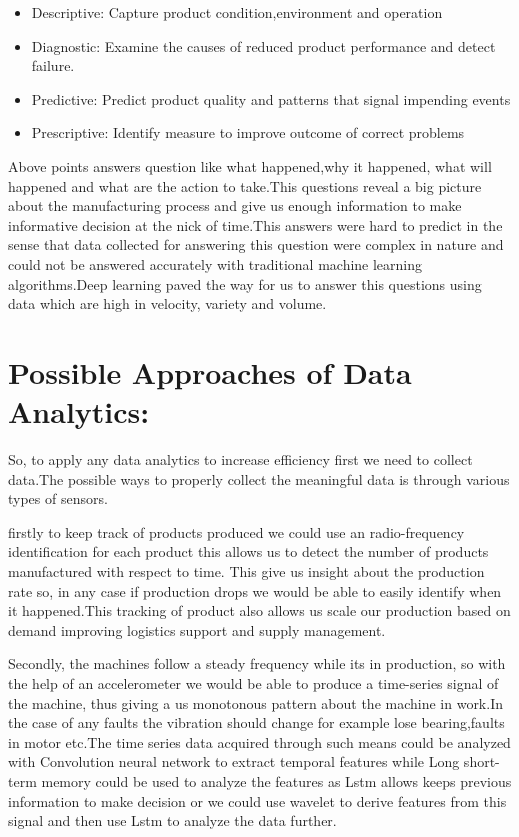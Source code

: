 \documentclass{article}
\begin{document}
\begin{normalsize}
\begin{itemize}
\item{Descriptive: Capture product condition,environment and operation}
\item{Diagnostic: Examine the causes of reduced product performance and detect failure. 
} 
\item{Predictive: Predict product quality and patterns that signal impending events}
\item{Prescriptive: Identify measure to improve outcome of correct problems}
	\end{itemize}
		Above points answers question like what happened,why it happened, what will happened and what are the action to take.This questions reveal a big picture about the manufacturing process and give us enough information to make informative decision at the nick of time.This answers were hard to predict in the sense that data collected for answering this question were complex in nature and could not be answered accurately with traditional machine learning algorithms.Deep learning paved the way for us to answer this questions using data which are high in velocity, variety and volume.
      \section{Possible Approaches of Data Analytics:}  
      So, to apply any data analytics  to increase efficiency first we need to collect data.The possible ways to properly collect the meaningful data is through various types of sensors.
      
      firstly to keep track of products produced we could use an radio-frequency identification for each product this allows us to detect the number of products manufactured with respect to time. This give us insight about the production rate so, in any case if production drops we would be able to easily identify when it happened.This tracking of product also allows us scale our production based on demand improving logistics support and supply management.
      
      Secondly, the machines follow a steady frequency while its in production, so with the help of an accelerometer we would be able to produce a time-series signal of the machine, thus giving a us monotonous pattern about the machine in work.In the case of any faults the vibration should change for example lose bearing,faults in motor etc.The time series data acquired through such means could be analyzed with Convolution neural network to extract temporal features while  Long short-term memory could be used to analyze the features as Lstm allows keeps previous information to make decision or we could use wavelet to derive features from this signal and then use Lstm to analyze the data further.
      

\end{normalsize}
\end{document}

